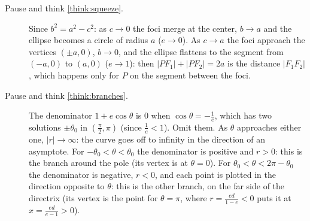 \documentclass[11pt]{article}
\begin{document}
\begin{description}
  \item[Pause and think \ref{think:squeeze}.] Since $b^2=a^2-c^2$: as $c\to0$ the foci merge at the center, $b\to a$ and the ellipse becomes a circle of radius $a$ ($e\to0$). As $c\to a$ the foci approach the vertices $(\pm a,0)$, $b\to0$, and the ellipse flattens to the segment from $(-a,0)$ to $(a,0)$ ($e\to1$): then $\lvert PF_1\rvert+\lvert PF_2\rvert=2a$ is the distance $\lvert F_1F_2\rvert$, which happens only for $P$ on the segment between the foci.

  \item[Pause and think \ref{think:branches}.] The denominator $1+e\cos\theta$ is $0$ when $\cos\theta=-\frac1e$, which has two solutions $\pm\theta_0$ in $\left(\frac\pi2,\pi\right)$ (since $\frac1e<1$). Omit them. As $\theta$ approaches either one, $\lvert r\rvert\to\infty$: the curve goes off to infinity in the direction of an asymptote. For $-\theta_0<\theta<\theta_0$ the denominator is positive and $r>0$: this is the branch around the pole (its vertex is at $\theta=0$). For $\theta_0<\theta<2\pi-\theta_0$ the denominator is negative, $r<0$, and each point is plotted in the direction opposite to $\theta$: this is the other branch, on the far side of the directrix (its vertex is the point for $\theta=\pi$, where $r=\frac{ed}{1-e}<0$ puts it at $x=\frac{ed}{e-1}>0$).
\end{description}
\end{document}
